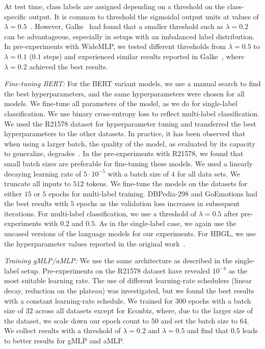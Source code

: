 \documentclass[acmsmall,nonacm]{acmart}
\newcommand{\mlp}{WideMLP\xspace}
\begin{document}
At test time, class labels are assigned depending on a threshold on the class-specific output.
It is common to threshold the sigmoidal output units at values of $\lambda = 0.5$~\cite{zhang,Tsoumakas}. 
However, Galke~\etal\cite{DBLP:conf/kcap/GalkeMSBS17} had found that a smaller threshold such as $\lambda=0.2$ can be advantageous, especially in setups with an imbalanced label distribution.
In pre-experiments with \mlp, we tested different thresholds from $\lambda=0.5$ to $\lambda=0.1$ ($0.1$ steps) and experienced similar results reported in Galke~\etal\cite{DBLP:conf/kcap/GalkeMSBS17}, where $\lambda=0.2$ achieved the best results.

\textit{Fine-tuning BERT:}
For the BERT variant models, we use a manual search to find the best hyperparameters, and the same hyperparameters were chosen for all models. 
We fine-tune all parameters of the model, as we do for single-label classification.
We use binary cross-entropy loss to reflect multi-label classification. 
We used the R21578 dataset for hyperparameter tuning and transferred the best hyperparameters to the other datasets.
In practice, it has been observed that when using a larger batch, the quality of the model, as evaluated by its capacity to generalize, degrades~\cite{NEURIPS2020_f3f27a32}.
In the pre-experiments with R21578, we found that small batch sizes are preferable for fine-tuning these models.
We used a linearly decaying learning rate of $5 \cdot 10^{-5}$ 
with a batch size of $4$ for all data sets.
We truncate all inputs to $512$ tokens.
We fine-tune the models on the datasets for either $15$ or $5$ epochs for multi-label training.
DBPedia-298 and GoEmotions had the best results with $5$ epochs as the validation loss increases in subsequent iterations.
For multi-label classification, we use a threshold of $\lambda=0.5$ after pre-experiments with $0.2$ and $0.5$. 
As in the single-label case, we again use the uncased versions of the language models for our experiments.
For HBGL, we use the hyperparameter values reported in the original work~\cite{hbgl}.

\textit{Training gMLP/aMLP:}
We use the same architecture as described in the single-label setup. Pre-experiments on the R21578 dataset have revealed $10^{-4}$ as the most suitable learning rate. The use of different learning-rate schedulers (linear decay, reduction on the plateau) was investigated, but we found the best results with a constant learning-rate schedule.
We trained for $300$ epochs with a batch size of $32$ across all datasets except for Econbiz, where, due to the larger size of the dataset, we scale down our epoch count to $50$ and set the batch size to $64$.  We collect results with a threshold of $\lambda=0.2$ and $\lambda=0.5$ and find that $0.5$ leads to better results for gMLP and aMLP.
\end{document}
